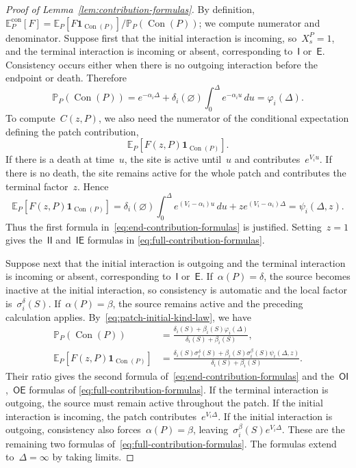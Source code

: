 \documentclass[EJP,preprint,NODS,nobera]{ejpecp}
\newcommand{\pP}{\mathbb{P}}
\newcommand{\E}{\mathbb{E}}
\newcommand{\bb}[1]{\left(#1\right)}
\newcommand{\Cb}[1]{\left[#1\right]}
\newcommand{\ind}{\mathbf{1}}
\newcommand{\chg}[1]{{\color{changegreen}#1}}
\begin{document}
\begin{proof}[Proof of Lemma~\ref{lem:contribution-formulas}]
\chg{By definition,~$\E_P^{\mathrm{con}}\Cb{F}
=\E_P\Cb{F\ind_{\operatorname{Con}(P)}}/\pP_P\bb{\operatorname{Con}(P)}$; we
compute numerator and denominator.}
Suppose first that the initial interaction is incoming, so~$X_s^P=1$, and the terminal interaction is incoming or absent,
corresponding to~$\mathsf I$ or~$\mathsf E$. Consistency occurs either when
there is no outgoing interaction before the endpoint or death. Therefore
\begin{equation*}
\pP_P\bb{\operatorname{Con}(P)}
=
e^{-\alpha_i\Delta}
+
\delta_i(\varnothing)
\int_0^\Delta e^{-\alpha_i u}\,du
=
\varphi_i(\Delta).
\end{equation*}
To compute~$C(z,P)$, we also need the numerator of
the conditional expectation defining the patch contribution,
\begin{equation*}
\E_P\Cb{F(z,P)\ind_{\operatorname{Con}(P)}}.
\end{equation*}
If there is a death at time~$u$, the site is active
until~$u$ and contributes~$e^{V_i u}$. If there is no death,
the site remains active for the whole patch and contributes the terminal
factor~$z$. Hence
\begin{equation*}
\E_P\Cb{F(z,P)\ind_{\operatorname{Con}(P)}}
=
\delta_i(\varnothing)
\int_0^\Delta e^{\bb{V_i-\alpha_i}u}\,du
+
z e^{\bb{V_i-\alpha_i}\Delta}
=
\psi_i(\Delta,z).
\end{equation*}
Thus the first formula in~\eqref{eq:end-contribution-formulas} is justified.
Setting~$z=1$ gives the~$\mathsf{II}$ and~$\mathsf{IE}$ formulas in
\eqref{eq:full-contribution-formulas}.

Suppose next that the initial interaction is outgoing and the
terminal interaction is incoming or absent, corresponding to~$\mathsf I$ or~$\mathsf E$. If~$\alpha(P)=\delta$, the source becomes inactive at
the initial interaction, so consistency is automatic and the local factor
is~$\sigma_i^\delta(S)$. If~$\alpha(P)=\beta$, the source remains active
and the preceding calculation applies. By~\eqref{eq:patch-initial-kind-law},
we have
\begin{align*}
\pP_P\bb{\operatorname{Con}(P)} &= 
\frac{
\delta_i(S)+\beta_i(S)\varphi_i(\Delta)
}{
\delta_i(S)+\beta_i(S)
},\\
\E_P\Cb{F(z,P)\ind_{\operatorname{Con}(P)}} &= \frac{
\delta_i(S)\sigma_i^\delta(S)
+
\beta_i(S)\sigma_i^\beta(S)\psi_i(\Delta,z)
}{
\delta_i(S)+\beta_i(S)
}.
\end{align*}
Their ratio gives the second formula of~\eqref{eq:end-contribution-formulas} and
the~$\mathsf{OI}$,~$\mathsf{OE}$ formulas of
\eqref{eq:full-contribution-formulas}. If the terminal interaction is outgoing, the source must
remain active throughout the patch. If the initial interaction is
incoming, the patch contributes~$e^{V_i\Delta}$. If the initial interaction
is outgoing, consistency also forces~$\alpha(P)=\beta$, leaving~$\sigma_i^\beta(S)e^{V_i\Delta}$. These are the remaining two formulas of~\eqref{eq:full-contribution-formulas}. The formulas extend to~$\Delta=\infty$ by taking limits.
\end{proof}
\end{document}
